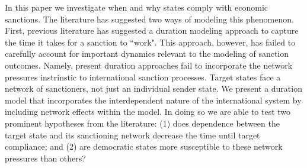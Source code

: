 In this paper we investigate when and why states comply with economic sanctions.  The literature has suggested two ways of modeling this phenomenon. First, previous literature has suggested a duration modeling approach to capture the time it takes for a sanction to ``work". This approach, however, has failed to carefully account for important dynamics relevant to the modeling of sanction outcomes. Namely, present duration approaches fail to incorporate the network pressures instrinstic to international sanction processes. Target states face a network of sanctioners, not just an individual sender state. We present a duration model that incorporates the interdependent nature of the international system by including network effects within the model. In doing so we are able to test two prominent hypotheses from the literature: (1) does dependence between the target state and its sanctioning network decrease the time until target compliance; and (2) are democratic states more susceptible to these network pressures than others?